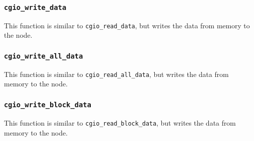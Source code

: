 \subsubsection{\texttt{cgio\_write\_data}} \label{write_data}
    \noindent
    This function is similar to \texttt{cgio\_read\_data},
    but writes the data from memory to the node.

\subsubsection{\texttt{cgio\_write\_all\_data}} \label{write_all_data}
    \noindent
    This function is similar to \texttt{cgio\_read\_all\_data},
    but writes the data from memory to the node.

\subsubsection{\texttt{cgio\_write\_block\_data}} \label{write_block_data}
    \noindent
    This function is similar to \texttt{cgio\_read\_block\_data},
    but writes the data from memory to the node.

